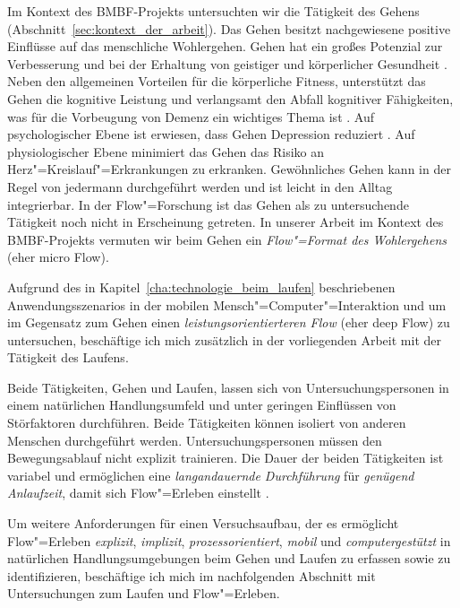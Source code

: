 

Im Kontext des \acs{BMBF}-Projekts untersuchten wir die Tätigkeit des Gehens (Abschnitt~\ref{sec:kontext_der_arbeit}). Das Gehen besitzt nachgewiesene positive Einflüsse auf das menschliche Wohlergehen. Gehen hat ein großes Potenzial zur Verbesserung und bei der Erhaltung von geistiger und körperlicher Gesundheit \citep{Lee2008, Morris1997}. Neben den allgemeinen Vorteilen für die körperliche Fitness, unterstützt das Gehen die kognitive Leistung und verlangsamt den Abfall kognitiver Fähigkeiten, was für die Vorbeugung von Demenz ein wichtiges Thema ist \citep{Weuve2004}. Auf psychologischer Ebene ist erwiesen, dass Gehen Depression reduziert \citep{Robertson2012}. Auf physiologischer Ebene minimiert das Gehen das Risiko an Herz"=Kreislauf"=Erkrankungen zu erkranken. Gewöhnliches Gehen kann in der Regel von jedermann durchgeführt werden und ist leicht in den Alltag integrierbar. In der Flow"=Forschung ist das Gehen als zu untersuchende Tätigkeit noch nicht in Erscheinung getreten. In unserer Arbeit im Kontext des \acs{BMBF}-Projekts vermuten wir beim Gehen ein \emph{Flow"=Format des Wohlergehens} (eher micro Flow). 

Aufgrund des in Kapitel~\ref{cha:technologie_beim_laufen} beschriebenen Anwendungsszenarios in der mobilen Mensch"=Computer"=Interaktion und um im Gegensatz zum Gehen einen \emph{leistungsorientierteren Flow} (eher deep Flow) zu untersuchen, beschäftige ich mich zusätzlich in der vorliegenden Arbeit mit der Tätigkeit des Laufens. 

Beide Tätigkeiten, Gehen und Laufen, lassen sich von Untersuchungspersonen in einem natürlichen Handlungsumfeld und unter geringen Einflüssen von Störfaktoren durchführen.  Beide Tätigkeiten können isoliert von anderen Menschen durchgeführt werden. Untersuchungspersonen müssen den Bewegungsablauf nicht explizit trainieren. Die Dauer der beiden Tätigkeiten ist variabel und ermöglichen eine \emph{langandauernde Durchführung} für \emph{genügend Anlaufzeit}, damit sich Flow"=Erleben einstellt \citep[S.~109]{Henk2014}.

Um weitere Anforderungen für einen Versuchsaufbau, der es ermöglicht Flow"=Erleben \emph{explizit}, \emph{implizit}, \emph{prozessorientiert}, \emph{mobil} und \emph{computergestützt} in natürlichen Handlungsumgebungen beim Gehen und Laufen zu erfassen sowie zu identifizieren, beschäftige ich mich im nachfolgenden Abschnitt mit Untersuchungen zum Laufen und Flow"=Erleben. 
